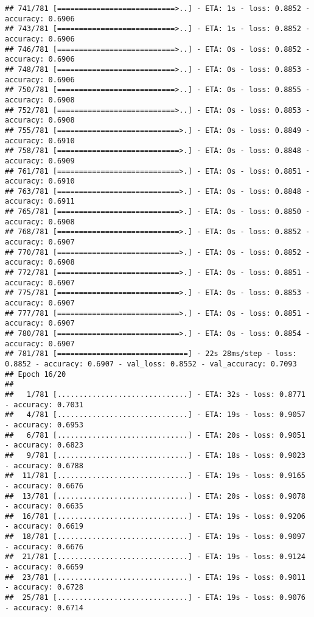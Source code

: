 \documentclass[
]{article}
\begin{document}
\begin{verbatim}
## 741/781 [===========================>..] - ETA: 1s - loss: 0.8852 - accuracy: 0.6906
## 743/781 [===========================>..] - ETA: 1s - loss: 0.8852 - accuracy: 0.6906
## 746/781 [===========================>..] - ETA: 0s - loss: 0.8852 - accuracy: 0.6906
## 748/781 [===========================>..] - ETA: 0s - loss: 0.8853 - accuracy: 0.6906
## 750/781 [===========================>..] - ETA: 0s - loss: 0.8855 - accuracy: 0.6908
## 752/781 [===========================>..] - ETA: 0s - loss: 0.8853 - accuracy: 0.6908
## 755/781 [============================>.] - ETA: 0s - loss: 0.8849 - accuracy: 0.6910
## 758/781 [============================>.] - ETA: 0s - loss: 0.8848 - accuracy: 0.6909
## 761/781 [============================>.] - ETA: 0s - loss: 0.8851 - accuracy: 0.6910
## 763/781 [============================>.] - ETA: 0s - loss: 0.8848 - accuracy: 0.6911
## 765/781 [============================>.] - ETA: 0s - loss: 0.8850 - accuracy: 0.6908
## 768/781 [============================>.] - ETA: 0s - loss: 0.8852 - accuracy: 0.6907
## 770/781 [============================>.] - ETA: 0s - loss: 0.8852 - accuracy: 0.6908
## 772/781 [============================>.] - ETA: 0s - loss: 0.8851 - accuracy: 0.6907
## 775/781 [============================>.] - ETA: 0s - loss: 0.8853 - accuracy: 0.6907
## 777/781 [============================>.] - ETA: 0s - loss: 0.8851 - accuracy: 0.6907
## 780/781 [============================>.] - ETA: 0s - loss: 0.8854 - accuracy: 0.6907
## 781/781 [==============================] - 22s 28ms/step - loss: 0.8852 - accuracy: 0.6907 - val_loss: 0.8552 - val_accuracy: 0.7093
## Epoch 16/20
## 
##   1/781 [..............................] - ETA: 32s - loss: 0.8771 - accuracy: 0.7031
##   4/781 [..............................] - ETA: 19s - loss: 0.9057 - accuracy: 0.6953
##   6/781 [..............................] - ETA: 20s - loss: 0.9051 - accuracy: 0.6823
##   9/781 [..............................] - ETA: 18s - loss: 0.9023 - accuracy: 0.6788
##  11/781 [..............................] - ETA: 19s - loss: 0.9165 - accuracy: 0.6676
##  13/781 [..............................] - ETA: 20s - loss: 0.9078 - accuracy: 0.6635
##  16/781 [..............................] - ETA: 19s - loss: 0.9206 - accuracy: 0.6619
##  18/781 [..............................] - ETA: 19s - loss: 0.9097 - accuracy: 0.6676
##  21/781 [..............................] - ETA: 19s - loss: 0.9124 - accuracy: 0.6659
##  23/781 [..............................] - ETA: 19s - loss: 0.9011 - accuracy: 0.6728
##  25/781 [..............................] - ETA: 19s - loss: 0.9076 - accuracy: 0.6714

\end{verbatim}
\end{document}
